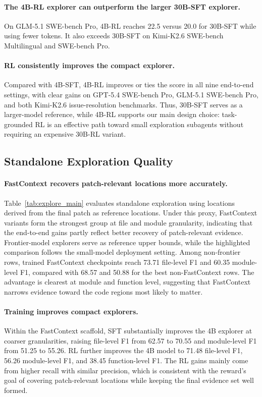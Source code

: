 \documentclass[11pt]{article}
\newcommand{\approach}{{FastContext}\xspace}
\begin{document}
\paragraph{The 4B-RL explorer can outperform the larger 30B-SFT explorer.}
On GLM-5.1 SWE-bench Pro, 4B-RL reaches 22.5 versus 20.0 for 30B-SFT while using fewer tokens.
It also exceeds 30B-SFT on Kimi-K2.6 SWE-bench Multilingual and SWE-bench Pro.

\paragraph{RL consistently improves the compact explorer.}
Compared with 4B-SFT, 4B-RL improves or ties the score in all nine end-to-end settings, with clear gains on GPT-5.4 SWE-bench Pro, GLM-5.1 SWE-bench Pro, and both Kimi-K2.6 issue-resolution benchmarks.
Thus, 30B-SFT serves as a larger-model reference, while 4B-RL supports our main design choice: task-grounded RL is an effective path toward small exploration subagents without requiring an expensive 30B-RL variant.




\subsection{Standalone Exploration Quality}
\label{sec:explore-results}
\vspace{-2mm}

\paragraph{\approach recovers patch-relevant locations more accurately.}
Table~\ref{tab:explore_main} evaluates standalone exploration using locations derived from the final patch as reference locations.
Under this proxy, \approach variants form the strongest group at file and module granularity, indicating that the end-to-end gains partly reflect better recovery of patch-relevant evidence.
Frontier-model explorers serve as reference upper bounds, while the highlighted comparison follows the small-model deployment setting.
Among non-frontier rows, trained \approach checkpoints reach 73.71 file-level F1 and 60.35 module-level F1, compared with 68.57 and 50.88 for the best non-\approach rows.
The advantage is clearest at module and function level, suggesting that \approach narrows evidence toward the code regions most likely to matter.

\paragraph{Training improves compact explorers.}
Within the \approach scaffold, SFT substantially improves the 4B explorer at coarser granularities, raising file-level F1 from 62.57 to 70.55 and module-level F1 from 51.25 to 55.26.
RL further improves the 4B model to 71.48 file-level F1, 56.26 module-level F1, and 38.45 function-level F1.
The RL gains mainly come from higher recall with similar precision, which is consistent with the reward's goal of covering patch-relevant locations while keeping the final evidence set well formed.
\end{document}
